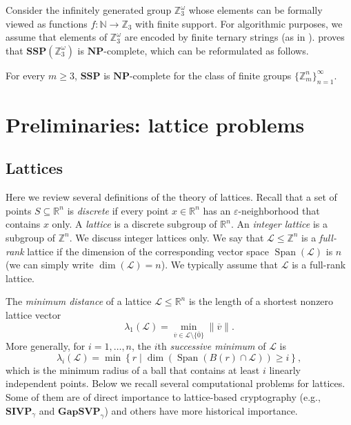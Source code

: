 \documentclass{jgcc}
\def\ovo{{\overline{0}}}
\def\ovv{{\overline{v}}}
\def\CL{{\mathcal L}}
\def\NP{{\mathbf{NP}}}
\def\SIVP{{\mathbf{SIVP}}}
\def\GAPSVP{{\mathbf{GapSVP}}}
\def\MN{{\mathbb{N}}}
\def\MZ{{\mathbb{Z}}}
\def\MR{{\mathbb{R}}}
\def\SSP{{\mathbf{SSP}}}
\DeclareMathOperator{\Span}{{Span}}
\begin{document}
Consider the infinitely generated group $\MZ_3^\omega$ whose elements 
can be formally viewed as functions $f\colon\MN\to\MZ_3$ with finite support.
For algorithmic purposes, we assume that elements of $\MZ_3^\omega$
are encoded by finite ternary strings 
(as in \cite[Section 4]{Miasnikov-Nikolaev-Ushakov:2014b}).
\cite[Proposition 2.1]{Nikolaev-Ushakov:2020} proves 
that $\SSP(\MZ_3^\omega)$ is $\NP$-complete, 
which can be reformulated as follows.

\begin{prop}\label{pr:SSP_Z3_omega}
For every $m\ge 3$, $\SSP$ is $\NP$-complete for the class 
of finite groups $\{\MZ_m^n\}_{n=1}^\infty$.
\end{prop}


\section{Preliminaries: lattice problems}


\subsection{Lattices}\label{se:lattices}

Here we review several definitions of the theory of lattices.
Recall that a set of points $S\subseteq \MR^n$ is 
\emph{discrete} if every point $x\in\MR^n$
has an $\varepsilon$-neighborhood
that contains $x$ only.
A \emph{lattice} is a discrete subgroup of $\MR^n$.
An \emph{integer lattice} is a subgroup of $\MZ^n$.
We discuss integer lattices only.
We say that $\CL\le \MZ^n$ is a \emph{full-rank} lattice 
if the dimension of the corresponding vector space $\Span(\CL)$
is $n$ (we can simply write $\dim(\CL)=n$).
We typically assume that $\CL$ is a full-rank lattice.

The \emph{minimum distance} of a lattice $\CL\le\MR^n$
is the length of a shortest nonzero lattice vector
$$
\lambda_1(\CL) = \min_{\ovv\in\CL\setminus\{\ovo\}} \|\ovv\|.
$$
More generally, for $i=1,\ldots,n$, the $i$th
\emph{successive minimum} of $\CL$ is 
$$
\lambda_i(\CL) = \min\left\{r\mid \dim(\Span(B(r)\cap\CL))\ge i\right\},
$$
which is the minimum radius of a ball that contains at least $i$
linearly independent points.
Below we recall several computational problems for lattices.
Some of them are of direct importance to lattice-based cryptography
(e.g., $\SIVP_\gamma$ and $\GAPSVP_\gamma$) and others have
more historical importance.
\end{document}
